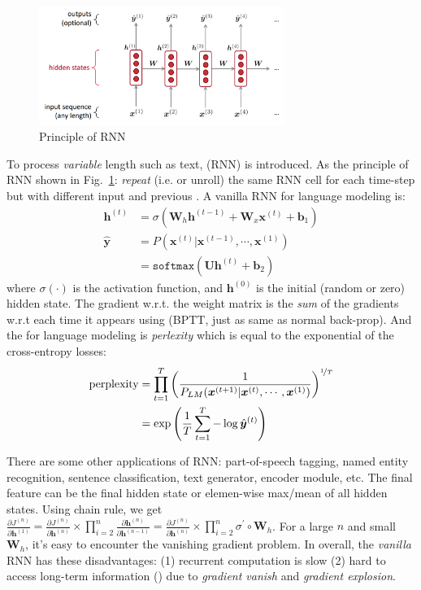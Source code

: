 \begin{figure}[!thp]
	\centerline{\includegraphics[width=8.0cm]{figs/RNN.png}}
	\caption{Principle of RNN}
	\label{RNN}
\end{figure}


To process \emph{variable} length  such as text,  (RNN) is introduced.
As the principle of RNN shown in Fig.~\ref{RNN}: \emph{repeat} (i.e.  or unroll) the same RNN cell for each time-step but with different input and previous .
A vanilla RNN for language modeling is:
\begin{align}
\bm{h}^{(t)} &= \sigma \left(\bm{W}_h \bm{h}^{(t-1)} + \bm{W}_x \bm{x}^{(t)} + \bm{b}_1\right) \nonumber \\
\hat{\bm{y}} &= P(\bm{x}^{(t)} | \bm{x}^{(t-1)}, \cdots, \bm{x}^{(1)}) \nonumber \nonumber \\
&= \texttt{softmax}(\bm{U}\bm{h}^{(t)} + \bm{b}_2) \nonumber
\end{align}
where $\sigma(\cdot)$ is the activation function, and $\bm{h}^{(0)}$ is the initial (random or zero) hidden state.
The gradient w.r.t. the weight matrix is the \emph{sum} of the gradients w.r.t each time it appears using  (BPTT, just as same as normal back-prop).
And the  for language modeling is \emph{perlexity} which is equal to the exponential of the cross-entropy losses:
\begin{align}
\text{perplexity} &= \prod_{t=1}^T \left(\frac{1}{P_{LM} (\bm{x}^{(t+1)} | \bm{x}^{(t)}, \cdots, \bm{x}^{(1)})}\right)^{\nicefrac{1}{T}} \nonumber \\
&= \exp\left(\frac{1}{T} \sum_{t=1}^T -\log \hat{\bm{y}}^{(t)}\right)
\end{align}

There are some other applications of RNN: part-of-speech tagging, named entity recognition, sentence classification, text generator, encoder module, etc.
The final feature can be the final hidden state or elemen-wise max/mean of all hidden states.
Using chain rule, we get $\frac{\partial J^{(n)}}{\partial \bm{h}^{(1)}} = \frac{\partial J^{(n)}}{\partial \bm{h}^{(n)}} \times \prod_{i=2}^n \frac{\partial \bm{h}^{(n)}}{\partial \bm{h}^{(n-1)}} = \frac{\partial J^{(n)}}{\partial \bm{h}^{(n)}} \times \prod_{i=2}^n \sigma^\prime \circ \bm{W}_h$.
For a large $n$ and small $\bm{W}_h$, it's easy to encounter the vanishing gradient problem.
In overall, the \emph{vanilla} RNN has these disadvantages: (1) recurrent computation is slow (2) hard to access long-term information () due to \emph{gradient vanish} and \emph{gradient explosion}.


